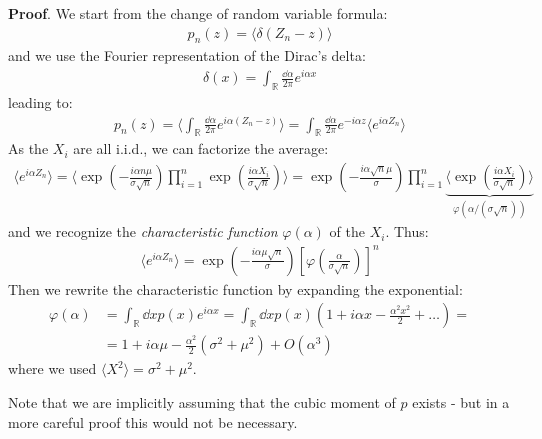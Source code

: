 \documentclass[../template.tex]{subfiles}
\begin{document}
\textbf{Proof}. We start from the change of random variable formula:
\begin{align*}
    p_n(z) = \langle \delta(Z_n-z) \rangle
\end{align*}
and we use the Fourier representation of the Dirac's delta:
\begin{align*}
    \delta(x) = \int_{\mathbb{R}} \frac{\dd{\alpha}}{2 \pi}  e^{i \alpha x}
\end{align*}
leading to:
\begin{align} \label{eqn:pnz}
    p_n(z) = \langle \int_{\mathbb{R}} \frac{\dd{\alpha}}{2\pi} e^{i \alpha (Z_n-z)}  \rangle = \int_{\mathbb{R}} \frac{\dd{\alpha}}{2 \pi} e^{-i \alpha z} \langle e^{i \alpha Z_n} \rangle 
\end{align} 
As the $X_i$ are all i.i.d., we can factorize the average:
\begin{align*}
    \langle e^{i \alpha Z_n} \rangle = \langle\exp\left(-\frac{i  \alpha n \mu}{\sigma \sqrt{n}}\right) \prod_{i=1}^n \exp\left(\frac{i \alpha X_i}{\sigma \sqrt{n}} \right) \rangle =\exp\left(-\frac{i \alpha\sqrt{n}\mu}{\sigma } \right) \prod_{i=1}^n \underbrace{\langle\exp\left(\frac{i \alpha X_i}{\sigma \sqrt{n}} \right)  \rangle}_{\varphi(\alpha/(\sigma \sqrt{n}))} 
\end{align*}
and we recognize the \textit{characteristic function} $\varphi(\alpha)$ of the $X_i$. Thus:
\begin{align}
    \langle e^{i \alpha Z_n} \rangle = \exp\left(-\frac{i \alpha \mu \sqrt{n}}{\sigma} \right) \left[\varphi\left(\frac{\alpha}{\sigma \sqrt{n}} \right)\right]^n
    \label{eqn:eian}
\end{align}
Then we rewrite the characteristic function by expanding the exponential:
\begin{align*}
    \varphi(\alpha) &= \int_{\mathbb{R}} \dd{x} p(x) e^{i \alpha x} = \int_{\mathbb{R}} \dd{x} p(x) \left(1 + i \alpha x - \frac{\alpha^2 x^2}{2} + \dots \right) =\\
    &= 1 + i \alpha \mu - \frac{\alpha^2}{2} (\sigma^2 + \mu^2) + O(\alpha^3) %
\end{align*}
where we used $\langle X^2 \rangle = \sigma^2 + \mu^2$. 

Note that we are implicitly assuming that the cubic moment of $p$ exists - but in a more careful proof this would not be necessary.

\medskip
\end{document}

